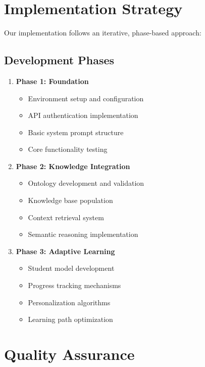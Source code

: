\section{Implementation Strategy}
\label{sec:implementation}

Our implementation follows an iterative, phase-based approach:

\subsection{Development Phases}
\label{subsec:dev-phases}

\begin{enumerate}
    \item \textbf{Phase 1: Foundation}
        \begin{itemize}
            \item Environment setup and configuration
            \item API authentication implementation
            \item Basic system prompt structure
            \item Core functionality testing
        \end{itemize}
    
    \item \textbf{Phase 2: Knowledge Integration}
        \begin{itemize}
            \item Ontology development and validation
            \item Knowledge base population
            \item Context retrieval system
            \item Semantic reasoning implementation
        \end{itemize}
    
    \item \textbf{Phase 3: Adaptive Learning}
        \begin{itemize}
            \item Student model development
            \item Progress tracking mechanisms
            \item Personalization algorithms
            \item Learning path optimization
        \end{itemize}
\end{enumerate}

\section{Quality Assurance}
\label{sec:quality}


